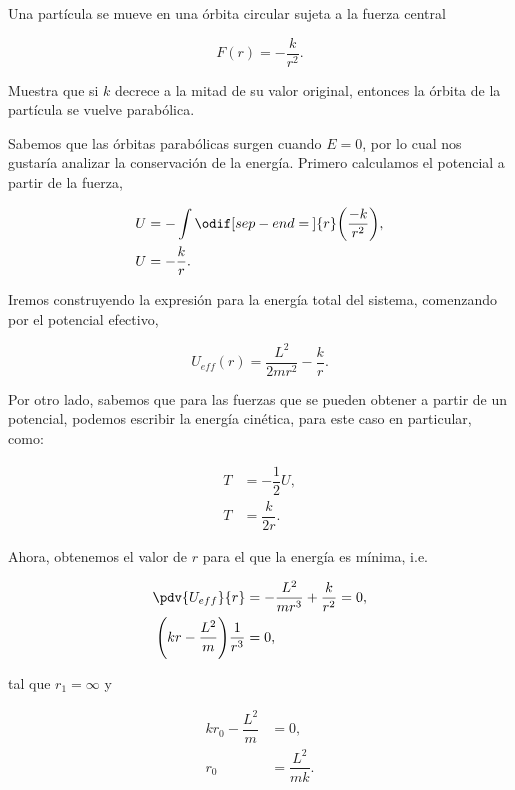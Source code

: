 \documentclass[../main.tex]{subfiles}
\begin{document}
\begin{problema}
	Una partícula se mueve en una órbita circular sujeta a la
	fuerza central

	\begin{equation}
		F(r) = -\dfrac{k}{r^{2}}.
	\end{equation}

	Muestra que si \(k\) decrece a la mitad de su valor original,
	entonces la órbita de la partícula se vuelve parabólica.

	\startsolution

	Sabemos que las órbitas parabólicas surgen cuando \(E = 0\), por lo cual nos gustaría
	analizar la conservación de la energía. Primero calculamos el potencial a partir de
	la fuerza,

	\begin{align}
		U & = - \int \odif[sep-end=\medspace]{r} \biggl(\dfrac{-k}{r^{2}}\biggr),\nonumber \\
		U & = - \dfrac{k}{r}.\label{eq:PotentialU-P1}
	\end{align}

	Iremos construyendo la expresión para la energía total del sistema, comenzando por el
	potencial efectivo,

	\begin{equation}
		U_{eff}(r) = \dfrac{L^{2}}{2mr^{2}} - \dfrac{k}{r}.
		\label{eq:EffectivePotential-P1}
	\end{equation}

	Por otro lado, sabemos que para las fuerzas que se pueden obtener a partir de un potencial,
	podemos escribir la energía cinética, para este caso en particular, como:

	\begin{align}
		T & = -\dfrac{1}{2}U,\nonumber             \\
		T & = \dfrac{k}{2r}.\label{eq:KineticE-P1}
	\end{align}

	Ahora, obtenemos el valor de \(r\) para el que la energía es mínima, i.e.

	\begin{align*}
		\pdv{U_{eff}}{r}                                    & = -\dfrac{L^{2}}{mr^{3}} + \dfrac{k}{r^{2}} = 0 , \\
		\Biggl(kr - \dfrac{L^{2}}{m}\Biggr)\dfrac{1}{r^{3}} & = 0,
	\end{align*}

	tal que \(r_{1} = \infty\) y

	\begin{align}
		kr_{0} - \dfrac{L^{2}}{m} & = 0 ,                                      \\
		r_{0}                     & = \dfrac{L^{2}}{mk}.\label{eq:RMinimum-P1}
	\end{align}


\end{problema}
\end{document}
